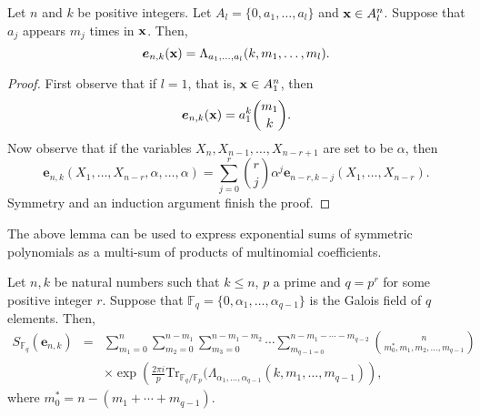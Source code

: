 \begin{lemma}
\label{lemmaSymm}
 Let $n$ and $k$ be positive integers.  Let $A_l=\{0,a_1,\ldots,a_l\}$ and ${\bf x} \in A_l^n$.  Suppose that $a_j$ appears $m_j$ times in ${\bf x}$.  Then,
 \begin{equation}
 \boldsymbol{e}_{n,k}({\bf x})=\Lambda_{a_1,\ldots,a_l}(k,m_1,\ldots,m_{l}). 
 \end{equation}
 \end{lemma}
\begin{proof}
First observe that if $l=1$, that is, ${\bf x} \in A_1^n$, then
\begin{equation}
 \boldsymbol{e}_{n,k}({\bf x}) = a_1^k\binom{m_1}{k}.
\end{equation}
Now observe that if the variables $X_n,X_{n-1},\ldots, X_{n-r+1}$ are set to be $\alpha$, then 
 \begin{equation}
  \boldsymbol{e}_{n,k}(X_1,\ldots, X_{n-r},\alpha,\ldots,\alpha)=\sum_{j=0}^r \binom{r}{j}\alpha^j\boldsymbol{e}_{n-r,k-j}(X_1,\ldots, X_{n-r}).
 \end{equation}
Symmetry and an induction argument  finish the proof.
\end{proof}

The above lemma can be used to express exponential sums of symmetric polynomials as a multi-sum of products of multinomial coefficients.

\begin{theorem}
\label{expsumformthm}
Let $n,k$ be natural numbers such that $k\leq n$, $p$ a prime and $q=p^r$ for some positive integer $r$. Suppose that $\mathbb{F}_q=\{0,\alpha_1,\ldots, \alpha_{q-1}\}$ is the Galois field of $q$ elements. 
Then,
\begin{eqnarray*}
S_{\mathbb{F}_q}(\boldsymbol{e}_{n,k})&=&\sum_{m_1=0}^n \sum_{m_2=0}^{n-m_1}\sum_{m_3=0}^{n-m_1-m_{2}}\cdots\sum_{m_{q-1=0}}^{n-m_{1}-\cdots-m_{q-2}} {n\choose m_0^*,m_1,m_2,\ldots, m_{q-1}}\\
&& \times \exp\left(\frac{2\pi i}{p} \text{Tr}_{\mathbb{F}_q/\mathbb{F}_p}(\Lambda_{\alpha_1,\ldots, \alpha_{q-1}}(k,m_1,\ldots, m_{q-1})\right),
\end{eqnarray*}
where $m_{0}^* = n-(m_1+\cdots+m_{q-1})$.
\end{theorem}

